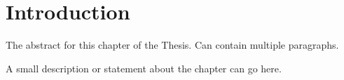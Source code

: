 \chapter{Introduction}
\glsresetall
\label{chap:1-introduction}

\begin{cabstract}
The abstract for this chapter of the Thesis. Can contain multiple paragraphs.

\blindtext
\blindtext
\end{cabstract}


A small description or statement about the chapter can go here.


